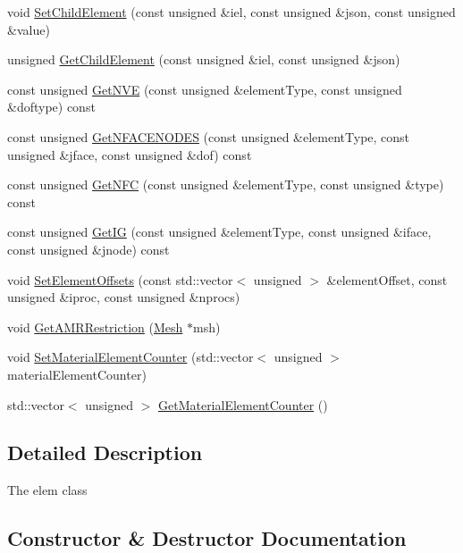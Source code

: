 \begin{DoxyCompactItemize}
\item 
void \mbox{\hyperlink{classfemus_1_1elem_ab5e398bd855bc8dc152313e1bd4c3f39}{Set\+Child\+Element}} (const unsigned \&iel, const unsigned \&json, const unsigned \&value)
\item 
unsigned \mbox{\hyperlink{classfemus_1_1elem_a743da48a9fee9fbb5091cd71a2e5bc98}{Get\+Child\+Element}} (const unsigned \&iel, const unsigned \&json)
\item 
const unsigned \mbox{\hyperlink{classfemus_1_1elem_a6539367756eeeb85dbd4e9c5da24951b}{Get\+N\+VE}} (const unsigned \&element\+Type, const unsigned \&doftype) const
\item 
const unsigned \mbox{\hyperlink{classfemus_1_1elem_add93a6ef1b8c8c3ca75b77c5ba9b5c01}{Get\+N\+F\+A\+C\+E\+N\+O\+D\+ES}} (const unsigned \&element\+Type, const unsigned \&jface, const unsigned \&dof) const
\item 
const unsigned \mbox{\hyperlink{classfemus_1_1elem_a01b20b2ba99d7a59ea3620a0e689e9f3}{Get\+N\+FC}} (const unsigned \&element\+Type, const unsigned \&type) const
\item 
const unsigned \mbox{\hyperlink{classfemus_1_1elem_a9b4bb98c0365d283a502ed4dc3c43db7}{Get\+IG}} (const unsigned \&element\+Type, const unsigned \&iface, const unsigned \&jnode) const
\item 
void \mbox{\hyperlink{classfemus_1_1elem_ac1a51ee2ade3b0cea57ba1a57e1c003d}{Set\+Element\+Offsets}} (const std\+::vector$<$ unsigned $>$ \&element\+Offset, const unsigned \&iproc, const unsigned \&nprocs)
\item 
void \mbox{\hyperlink{classfemus_1_1elem_a822ba86baca0f55483331479b78b6411}{Get\+A\+M\+R\+Restriction}} (\mbox{\hyperlink{classfemus_1_1_mesh}{Mesh}} $\ast$msh)
\item 
void \mbox{\hyperlink{classfemus_1_1elem_a72997e17f23dc7b2a867c66fef3f5b3c}{Set\+Material\+Element\+Counter}} (std\+::vector$<$ unsigned $>$ material\+Element\+Counter)
\item 
std\+::vector$<$ unsigned $>$ \mbox{\hyperlink{classfemus_1_1elem_a40dd00e3077c184757d342bfbf33fefc}{Get\+Material\+Element\+Counter}} ()
\end{DoxyCompactItemize}


\subsection{Detailed Description}
The elem class 

\subsection{Constructor \& Destructor Documentation}
\mbox{\label{classfemus_1_1elem_af0d54d7c0c7a5c0a7d1f0586ff28fa41}} 
